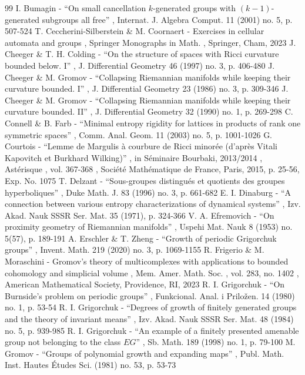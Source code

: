 \begin{thebibliography}{99}
 I. Bumagin - “On small cancellation $k$-generated groups with $(k-1)$-generated subgroups all free” , Internat. J. Algebra Comput. 11 (2001) no. 5, p. 507-524
 T. Ceccherini-Silberstein \& M. Coornaert - Exercises in cellular automata and groups , Springer Monographs in Math. , Springer, Cham, 2023
 J. Cheeger \& T. H. Colding - “On the structure of spaces with Ricci curvature bounded below. I” , J. Differential Geometry 46 (1997) no. 3, p. 406-480
 J. Cheeger \& M. Gromov - “Collapsing Riemannian manifolds while keeping their curvature bounded. I” , J. Differential Geometry 23 (1986) no. 3, p. 309-346
 J. Cheeger \& M. Gromov - “Collapsing Riemannian manifolds while keeping their curvature bounded. II” , J. Differential Geometry 32 (1990) no. 1, p. 269-298
 C. Connell \& B. Farb - “Minimal entropy rigidity for lattices in products of rank one symmetric spaces” , Comm. Anal. Geom. 11 (2003) no. 5, p. 1001-1026
 G. Courtois - “Lemme de Margulis à courbure de Ricci minorée (d’après Vitali Kapovitch et Burkhard Wilking)” , in Séminaire Bourbaki, 2013/2014 , Astérisque , vol. 367-368 , Société Mathématique de France, Paris, 2015, p. 25-56, Exp. No. 1075
 T. Delzant - “Sous-groupes distingués et quotients des groupes hyperboliques” , Duke Math. J. 83 (1996) no. 3, p. 661-682
 E. I. Dinaburg - “A connection between various entropy characterizations of dynamical systems” , Izv. Akad. Nauk SSSR Ser. Mat. 35 (1971), p. 324-366
 V. A. Efremovich - “On proximity geometry of Riemannian manifolds” , Uspehi Mat. Nauk 8 (1953) no. 5(57), p. 189-191
 A. Erschler \& T. Zheng - “Growth of periodic Grigorchuk groups” , Invent. Math. 219 (2020) no. 3, p. 1069-1155
 R. Frigerio \& M. Moraschini - Gromov’s theory of multicomplexes with applications to bounded cohomology and simplicial volume , Mem. Amer. Math. Soc. , vol. 283, no. 1402 , American Mathematical Society, Providence, RI, 2023
 R. I. Grigorchuk - “On Burnside’s problem on periodic groups” , Funkcional. Anal. i Priložen. 14 (1980) no. 1, p. 53-54
 R. I. Grigorchuk - “Degrees of growth of finitely generated groups and the theory of invariant means” , Izv. Akad. Nauk SSSR Ser. Mat. 48 (1984) no. 5, p. 939-985
 R. I. Grigorchuk - “An example of a finitely presented amenable group not belonging to the class $EG$” , Sb. Math. 189 (1998) no. 1, p. 79-100
 M. Gromov - “Groups of polynomial growth and expanding maps” , Publ. Math. Inst. Hautes Études Sci. (1981) no. 53, p. 53-73

\end{thebibliography}
